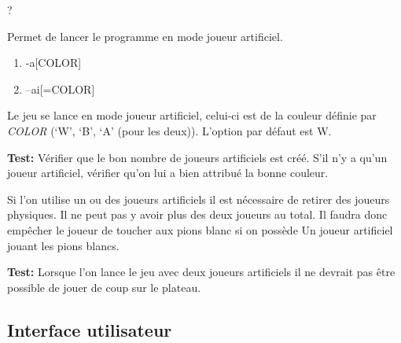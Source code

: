 \documentclass{article}
\begin{document}
\begin{needbox}
    ?
\end{needbox}

\begin{needbox}
    Permet de lancer le programme en mode joueur artificiel.
    \begin{subneedbox}
        \begin{enumerate}
            \item -a[COLOR]
            \item --ai[=COLOR]
        \end{enumerate}
        Le jeu se lance en mode joueur artificiel, celui-ci est de la couleur
        définie par \textit{COLOR} (`W', `B', `A' (pour les deux)). L'option 
        par défaut est W.

        \textbf{Test:} Vérifier que le bon nombre de joueurs artificiels est créé. 
        S'il n'y a qu'un joueur artificiel, vérifier qu'on lui a bien attribué la bonne
        couleur.
    \end{subneedbox}
    \begin{subneedbox}
        Si l'on utilise un ou des joueurs artificiels il est nécessaire de retirer
        des joueurs physiques. Il ne peut pas y avoir plus des deux joueurs au total.
        Il faudra donc empêcher le joueur de toucher aux pions blanc si on possède Un
        joueur artificiel jouant les pions blancs.

        \textbf{Test:} Lorsque l'on lance le jeu avec deux joueurs artificiels il ne 
        devrait pas être possible de jouer de coup sur le plateau.
    \end{subneedbox}
\end{needbox}

\subsection{Interface utilisateur}
\end{document}
